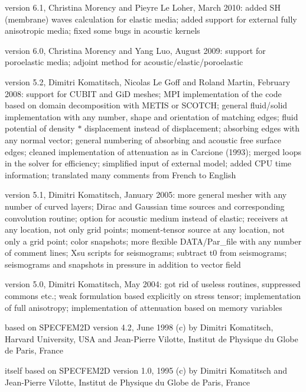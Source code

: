 version 6.1, Christina Morency and Pieyre Le Loher, March 2010:\newline
added SH (membrane) waves calculation for elastic media;
added support for external fully anisotropic media;
fixed some bugs in acoustic kernels\newline

version 6.0, Christina Morency and Yang Luo, August 2009:\newline
support for poroelastic media;
adjoint method for acoustic/elastic/poroelastic\newline

version 5.2, Dimitri Komatitsch, Nicolas Le Goff and Roland Martin, February 2008:\newline
support for CUBIT and GiD meshes;
MPI implementation of the code based on domain decomposition with METIS or SCOTCH;
general fluid/solid implementation with any number, shape and orientation of matching edges;
fluid potential of density $*$ displacement instead of displacement;
absorbing edges with any normal vector;
general numbering of absorbing and acoustic free surface edges;
cleaned implementation of attenuation as in Carcione (1993);
merged loops in the solver for efficiency;
simplified input of external model;
added CPU time information;
translated many comments from French to English\newline

version 5.1, Dimitri Komatitsch, January 2005:\newline
more general mesher with any number of curved layers;
Dirac and Gaussian time sources and corresponding convolution routine;
option for acoustic medium instead of elastic;
receivers at any location, not only grid points;
moment-tensor source at any location, not only a grid point;
color snapshots;
more flexible DATA/Par\_file with any number of comment lines;
Xsu scripts for seismograms;
subtract t0 from seismograms;
seismograms and snapshots in pressure in addition to vector field\newline

version 5.0, Dimitri Komatitsch, May 2004:\newline
got rid of useless routines, suppressed commons etc.;
weak formulation based explicitly on stress tensor;
implementation of full anisotropy;
implementation of attenuation based on memory variables\newline

based on SPECFEM2D version 4.2, June 1998\newline
(c) by Dimitri Komatitsch, Harvard University, USA
and Jean-Pierre Vilotte, Institut de Physique du Globe de Paris, France

itself based on SPECFEM2D version 1.0, 1995\newline
(c) by Dimitri Komatitsch and Jean-Pierre Vilotte,
Institut de Physique du Globe de Paris, France


